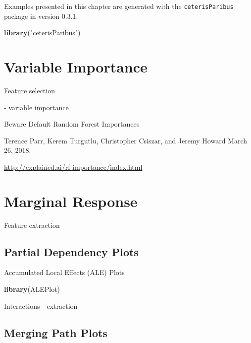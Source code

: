 \documentclass[]{book}
\newenvironment{Shaded}{\begin{snugshade}}{\end{snugshade}}
\newcommand{\KeywordTok}[1]{\textcolor[rgb]{0.13,0.29,0.53}{\textbf{#1}}}
\newcommand{\NormalTok}[1]{#1}
\newcommand{\StringTok}[1]{\textcolor[rgb]{0.31,0.60,0.02}{#1}}
\theoremstyle{definition}
\theoremstyle{definition}
\theoremstyle{definition}
\theoremstyle{remark}
\begin{document}
Examples presented in this chapter are generated with the
\texttt{ceterisParibus} package in version 0.3.1.

\begin{Shaded}
\begin{Highlighting}[]
\KeywordTok{library}\NormalTok{(}\StringTok{"ceterisParibus"}\NormalTok{)}
\end{Highlighting}
\end{Shaded}

\hypertarget{variable-importance}{%
\chapter{Variable Importance}\label{variable-importance}}

Feature selection

\citep{Strobl2007} \citep{Strobl2008} - variable importance

\citep{2018arXiv180101489F}

Beware Default Random Forest Importances

Terence Parr, Kerem Turgutlu, Christopher Csiszar, and Jeremy Howard
March 26, 2018.

\url{http://explained.ai/rf-importance/index.html}

\hypertarget{marginal-response}{%
\chapter{Marginal Response}\label{marginal-response}}

Feature extraction

\hypertarget{partial-dependency-plots}{%
\section{Partial Dependency Plots}\label{partial-dependency-plots}}

Accumulated Local Effects (ALE) Plots

\citep{RJ2017016} \citep{R-ALEPlot}

\begin{Shaded}
\begin{Highlighting}[]
\KeywordTok{library}\NormalTok{(ALEPlot)}
\end{Highlighting}
\end{Shaded}

\citep{MAGIX}

Interactions - extraction

\hypertarget{merging-path-plots}{%
\section{Merging Path Plots}\label{merging-path-plots}}
\end{document}
